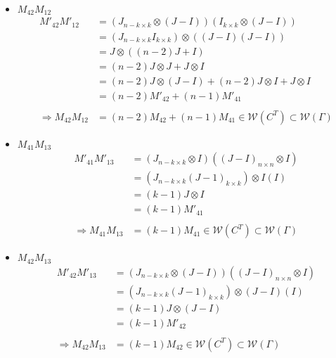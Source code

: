 \documentclass{article}
\begin{document}
\begin{itemize}
\begin{itemize}
\begin{itemize}
            \item $M_{42}M_{12}$ \\
            \begin{align*}
                M'_{42}M'_{12}
                &= (J_{n-k\times k}\otimes (J-I))(I_{k\times k}\otimes(J-I)) \\
                &= (J_{n-k\times k}I_{k\times k})\otimes((J-I)(J-I)) \\
                &= J\otimes ((n-2)J + I) \\
                &= (n-2)J\otimes J +  J\otimes I\\
                &= (n-2)J\otimes(J-I) + (n-2)J\otimes I + J\otimes I\\
                &= (n-2)M'_{42} + (n-1)M'_{41} \\ \\
                \Rightarrow M_{42}M_{12} &= (n-2)M_{42} + (n-1)M_{41} \in \mathcal{W}(C^T) \subset \mathcal{W}(\Gamma)
            \end{align*}

            \item $M_{41}M_{13}$ \\
            \begin{align*}
                M'_{41}M'_{13}
                &= (J_{n-k\times k}\otimes I)((J-I)_{n\times n}\otimes I) \\
                &= (J_{n-k\times k}(J-1)_{k\times k})\otimes I(I) \\
                &= (k-1)J\otimes I\\
                &= (k-1)M'_{41} \\ \\
                \Rightarrow M_{41}M_{13} &= (k-1)M_{41} \in \mathcal{W}(C^T) \subset \mathcal{W}(\Gamma)
            \end{align*}
            
            \item $M_{42}M_{13}$ \\
            \begin{align*}
                M'_{42}M'_{13}
                &= (J_{n-k\times k}\otimes (J-I))((J-I)_{n\times n}\otimes I) \\
                &= (J_{n-k\times k}(J-1)_{k\times k})\otimes (J-I)(I) \\
                &= (k-1)J\otimes (J-I)\\
                &= (k-1)M'_{42} \\ \\
                \Rightarrow M_{42}M_{13} &= (k-1)M_{42} \in \mathcal{W}(C^T) \subset \mathcal{W}(\Gamma)
            \end{align*}


\end{itemize}
\end{itemize}
\end{itemize}
\end{document}
